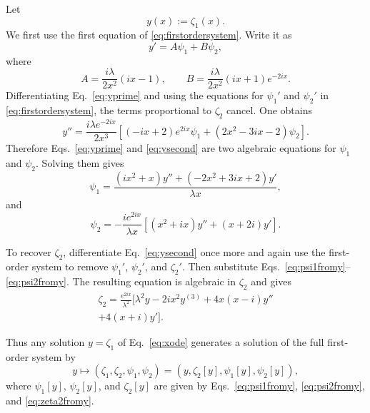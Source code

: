\documentclass[%
 aip,
 jmp,%
 amsmath,amssymb,
 reprint,%
]{revtex4-2}
\begin{document}
Let
\begin{equation}
y(x):=\zeta_1(x).
\end{equation}
We first use the first equation of \eqref{eq:firstordersystem}.  Write it as
\begin{equation}
\label{eq:yprime}
y'=A\psi_1+B\psi_2,
\end{equation}
where
\begin{equation}
A=\frac{i\lambda}{2x^2}(ix-1),
\qquad
B=\frac{i\lambda}{2x^2}(ix+1)e^{-2ix}.
\end{equation}
Differentiating Eq.~\eqref{eq:yprime} and using the equations for
$\psi_1'$ and $\psi_2'$ in \eqref{eq:firstordersystem}, the terms proportional
to $\zeta_2$ cancel.  One obtains
\begin{equation}
\label{eq:ysecond}
y''
=
\frac{i\lambda e^{-2ix}}{2x^3}
\left[
(-ix+2)e^{2ix}\psi_1
+(2x^2-3ix-2)\psi_2
\right].
\end{equation}
Therefore Eqs.~\eqref{eq:yprime} and \eqref{eq:ysecond} are two algebraic
equations for $\psi_1$ and $\psi_2$.  Solving them gives
\begin{equation}
\label{eq:psi1fromy}
\psi_1
=
\frac{
(ix^2+x)y''
+(-2x^2+3ix+2)y'
}
{\lambda x},
\end{equation}
and
\begin{equation}
\label{eq:psi2fromy}
\psi_2
=
-\frac{i e^{2ix}}{\lambda x}
\left[
(x^2+ix)y''
+(x+2i)y'
\right].
\end{equation}

To recover $\zeta_2$, differentiate Eq.~\eqref{eq:ysecond} once more and again
use the first-order system to remove $\psi_1'$, $\psi_2'$, and $\zeta_2'$.
Then substitute Eqs.~\eqref{eq:psi1fromy}--\eqref{eq:psi2fromy}.  The resulting
equation is algebraic in $\zeta_2$ and gives
\begin{equation}
\label{eq:zeta2fromy}
\begin{multlined}
\zeta_2
=
\frac{e^{2ix}}{\lambda^2}
\Big[
\lambda^2 y
-2ix^2y^{(3)}
+4x(x-i)y''\\
+4(x+i)y'
\Big].
\end{multlined}
\end{equation}

Thus any solution $y=\zeta_1$ of Eq.~\eqref{eq:xode} generates a solution of
the full first-order system by
\begin{equation}
\label{eq:fullmap}
y
\longmapsto
\left(
\zeta_1,\zeta_2,\psi_1,\psi_2
\right)
=
\left(
y,\zeta_2[y],\psi_1[y],\psi_2[y]
\right),
\end{equation}
where $\psi_1[y]$, $\psi_2[y]$, and $\zeta_2[y]$ are given by
Eqs.~\eqref{eq:psi1fromy}, \eqref{eq:psi2fromy}, and
\eqref{eq:zeta2fromy}.
\end{document}
